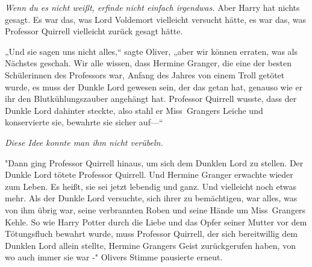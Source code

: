 \emph{Wenn du es nicht weißt, erfinde nicht einfach irgendwas.}
Aber Harry hat nichts gesagt. Es war das, was Lord Voldemort vielleicht versucht hätte, es war das, was Professor Quirrell vielleicht zurück gesagt hätte.

„Und sie sagen uns nicht alles,“ sagte Oliver, „aber wir können erraten, was als Nächstes geschah. Wir alle wissen, dass Hermine Granger, die eine der besten Schülerinnen des Professors war, Anfang des Jahres von einem Troll getötet wurde, es muss der Dunkle Lord gewesen sein, der das getan hat, genauso wie er ihr den Blutkühlungszauber angehängt hat. Professor Quirrell wusste, dass der Dunkle Lord dahinter steckte, also stahl er Miss~Grangers Leiche und konservierte sie, bewahrte sie sicher auf—“

\emph{Diese Idee konnte man ihm nicht verübeln.}

"Dann ging Professor Quirrell hinaus, um sich dem Dunklen Lord zu stellen. Der Dunkle Lord tötete Professor Quirrell. Und Hermine Granger erwachte wieder zum Leben. Es heißt, sie sei jetzt lebendig und ganz. Und vielleicht noch etwas mehr.
Als der Dunkle Lord versuchte, sich ihrer zu bemächtigen, war alles, was von ihm übrig war, seine verbrannten Roben und seine Hände um Miss~Grangers Kehle.
So wie Harry Potter durch die Liebe und das Opfer seiner Mutter vor dem Tötungsfluch bewahrt wurde, muss Professor Quirrell, der sich bereitwillig dem Dunklen Lord allein stellte, Hermine Grangers Geist zurückgerufen haben, von wo auch immer sie war -"
Olivers Stimme pausierte erneut.

